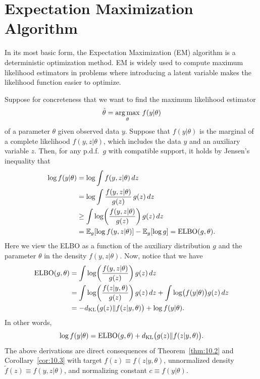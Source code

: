
\section{Expectation Maximization Algorithm}
\label{sec:10.2}

In its most basic form, the Expectation Maximization (EM) algorithm is a deterministic optimization
method. EM is widely used to compute maximum likelihood estimators in problems where introducing a
latent variable makes the likelihood function easier to optimize.

Suppose for concreteness that we want to find the maximum likelihood estimator
\[
  \hat{\theta} = \operatorname*{arg\,max}_{\theta}\, f(y|\theta)
\]
of a parameter $\theta$ given observed data $y$. Suppose that $f(y|\theta)$ is the marginal of a
complete likelihood $f(y, z|\theta)$, which includes the data $y$ and an auxiliary variable $z$.
Then, for any p.d.f.\ $g$ with compatible support, it holds by Jensen's inequality that
\begin{align*}
  \log f(y|\theta)
    &= \log \int f(y, z|\theta)\,dz \\
    &= \log \int \frac{f(y,z|\theta)}{g(z)}\, g(z)\,dz \\
    &\geq \int \log\!\left(\frac{f(y,z|\theta)}{g(z)}\right) g(z)\,dz \\
    &= \mathbb{E}_g[\log f(y, z|\theta)] - \mathbb{E}_g[\log g] = \mathrm{ELBO}(g, \theta).
\end{align*}
Here we view the ELBO as a function of the auxiliary distribution $g$ and the parameter $\theta$ in
the density $f(y, z|\theta)$. Now, notice that we have
\begin{align*}
  \mathrm{ELBO}(g, \theta)
    &= \int \log\!\left(\frac{f(y,z|\theta)}{g(z)}\right) g(z)\,dz \\
    &= \int \log\!\left(\frac{f(z|y,\theta)}{g(z)}\right) g(z)\,dz + \int \log\bigl(f(y|\theta)\bigr) g(z)\,dz \\
    &= -d_{\mathrm{KL}}\bigl(g(z)\|f(z|y,\theta)\bigr) + \log f(y|\theta).
\end{align*}
In other words,
\begin{equation}
  \log f(y|\theta) = \mathrm{ELBO}(g, \theta) + d_{\mathrm{KL}}\bigl(g(z)\|f(z|y,\theta)\bigr).
  \label{eq:10.3}
\end{equation}
The above derivations are direct consequences of Theorem~\ref{thm:10.2} and
Corollary~\ref{cor:10.3} with target $f(z) \equiv f(z|y,\theta)$, unnormalized density
$\tilde{f}(z) \equiv f(y,z|\theta)$, and normalizing constant $c \equiv f(y|\theta)$.

